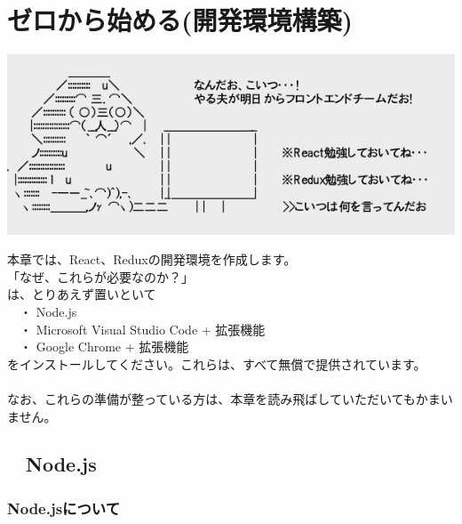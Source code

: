 \chapter{ゼロから始める(開発環境構築)}
\label{chap:01-createDevEnv}
\begin{reviewimage}%
\includegraphics[width=1.0\maxwidth]{./images/01-createDevEnv/01_00asignToFrontend.png}%
\label{image:01-createDevEnv:01_00asignToFrontend}
\end{reviewimage}
\begin{starterabstract}
  本章では、React、Reduxの開発環境を作成します。\\[0pt]

「なぜ、これらが必要なのか？」\\[0pt]

  は、とりあえず置いといて\\[0pt]
  　・ Node.js\\[0pt]
  　・ Microsoft Visual Studio Code + 拡張機能\\[0pt]
  　・ Google Chrome + 拡張機能\\[0pt]
をインストールしてください。これらは、すべて無償で提供されています。\\[0pt]
\\[0pt]
なお、これらの準備が整っている方は、本章を読み飛ばしていただいてもかまいません。
\end{starterabstract}

\section{　Node.js}
\keeplastskip{
  \label{sec:1-1}
  \label{sec-nodejs}
  \par\nobreak
}

\subsection{Node.jsについて}
\keeplastskip{
  \label{sec:1-1-1}
  \par\nobreak
}

